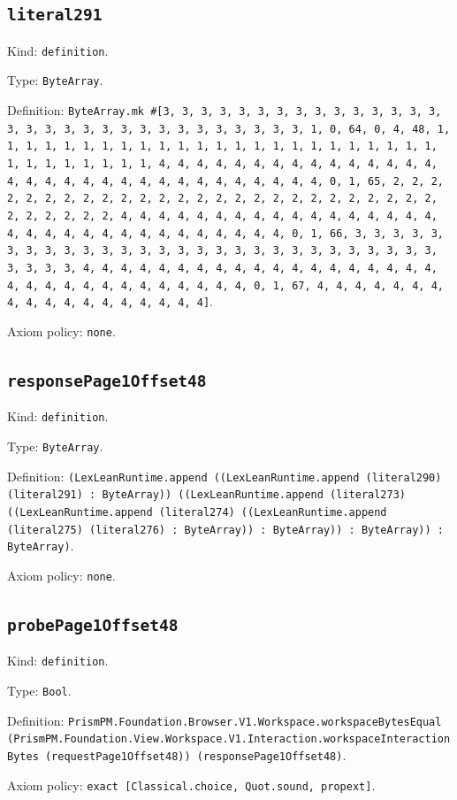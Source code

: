 \documentclass[11pt]{article}
\begin{document}
\subsection*{\texttt{literal291}}
\noindent Kind: \texttt{definition}.\par
\noindent Type: \texttt{ByteArray}.\par
\noindent Definition: \texttt{ByteArray.mk \#[3, 3, 3, 3, 3, 3, 3, 3, 3, 3, 3, 3, 3, 3, 3, 3, 3, 3, 3, 3, 3, 3, 3, 3, 3, 3, 3, 3, 3, 3, 3, 1, 0, 64, 0, 4, 48, 1, 1, 1, 1, 1, 1, 1, 1, 1, 1, 1, 1, 1, 1, 1, 1, 1, 1, 1, 1, 1, 1, 1, 1, 1, 1, 1, 1, 1, 1, 1, 1, 4, 4, 4, 4, 4, 4, 4, 4, 4, 4, 4, 4, 4, 4, 4, 4, 4, 4, 4, 4, 4, 4, 4, 4, 4, 4, 4, 4, 4, 4, 4, 4, 0, 1, 65, 2, 2, 2, 2, 2, 2, 2, 2, 2, 2, 2, 2, 2, 2, 2, 2, 2, 2, 2, 2, 2, 2, 2, 2, 2, 2, 2, 2, 2, 2, 2, 2, 4, 4, 4, 4, 4, 4, 4, 4, 4, 4, 4, 4, 4, 4, 4, 4, 4, 4, 4, 4, 4, 4, 4, 4, 4, 4, 4, 4, 4, 4, 4, 4, 0, 1, 66, 3, 3, 3, 3, 3, 3, 3, 3, 3, 3, 3, 3, 3, 3, 3, 3, 3, 3, 3, 3, 3, 3, 3, 3, 3, 3, 3, 3, 3, 3, 3, 3, 4, 4, 4, 4, 4, 4, 4, 4, 4, 4, 4, 4, 4, 4, 4, 4, 4, 4, 4, 4, 4, 4, 4, 4, 4, 4, 4, 4, 4, 4, 4, 4, 0, 1, 67, 4, 4, 4, 4, 4, 4, 4, 4, 4, 4, 4, 4, 4, 4, 4, 4, 4, 4]}.\par
\noindent Axiom policy: \texttt{none}.\par
\subsection*{\texttt{responsePage1Offset48}}
\noindent Kind: \texttt{definition}.\par
\noindent Type: \texttt{ByteArray}.\par
\noindent Definition: \texttt{(LexLeanRuntime.append ((LexLeanRuntime.append (literal290) (literal291) : ByteArray)) ((LexLeanRuntime.append (literal273) ((LexLeanRuntime.append (literal274) ((LexLeanRuntime.append (literal275) (literal276) : ByteArray)) : ByteArray)) : ByteArray)) : ByteArray)}.\par
\noindent Axiom policy: \texttt{none}.\par
\subsection*{\texttt{probePage1Offset48}}
\noindent Kind: \texttt{definition}.\par
\noindent Type: \texttt{Bool}.\par
\noindent Definition: \texttt{PrismPM.Foundation.Browser.V1.Workspace.workspaceBytesEqual (PrismPM.Foundation.View.Workspace.V1.Interaction.workspaceInteractionBytes (requestPage1Offset48)) (responsePage1Offset48)}.\par
\noindent Axiom policy: \texttt{exact [Classical.choice, Quot.sound, propext]}.\par
\end{document}
